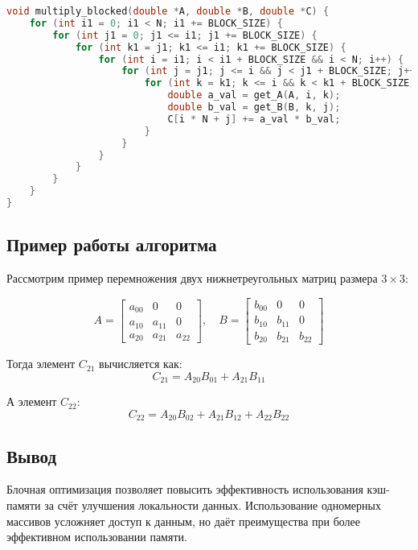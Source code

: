 \documentclass[14pt, russian]{matmex-diploma-custom}
\begin{document}
{\footnotesize
\begin{lstlisting}[language=C, caption={Алгоритм перемножения с блокировкой для 1D массивов}]
void multiply_blocked(double *A, double *B, double *C) {
    for (int i1 = 0; i1 < N; i1 += BLOCK_SIZE) {
        for (int j1 = 0; j1 <= i1; j1 += BLOCK_SIZE) {
            for (int k1 = j1; k1 <= i1; k1 += BLOCK_SIZE) {
                for (int i = i1; i < i1 + BLOCK_SIZE && i < N; i++) {
                    for (int j = j1; j <= i && j < j1 + BLOCK_SIZE; j++) {
                        for (int k = k1; k <= i && k < k1 + BLOCK_SIZE; k++) {
                            double a_val = get_A(A, i, k);
                            double b_val = get_B(B, k, j);
                            C[i * N + j] += a_val * b_val;
                        }
                    }
                }
            }
        }
    }
}

\end{lstlisting}
}

\subsection*{Пример работы алгоритма}

Рассмотрим пример перемножения двух нижнетреугольных матриц размера $3 \times 3$:

\begin{equation*}
A = \begin{bmatrix}
a_{00} & 0       & 0 \\
a_{10} & a_{11} & 0 \\
a_{20} & a_{21} & a_{22}
\end{bmatrix}, \quad
B = \begin{bmatrix}
b_{00} & 0       & 0 \\
b_{10} & b_{11} & 0 \\
b_{20} & b_{21} & b_{22}
\end{bmatrix}
\end{equation*}

Тогда элемент $C_{21}$ вычисляется как:
\begin{equation*}
C_{21} = A_{20} B_{01} + A_{21} B_{11}
\end{equation*}

А элемент $C_{22}$:
\begin{equation*}
C_{22} = A_{20} B_{02} + A_{21} B_{12} + A_{22} B_{22}
\end{equation*}

\subsection*{Вывод}
Блочная оптимизация позволяет повысить эффективность использования кэш-памяти за счёт улучшения локальности данных. Использование одномерных массивов усложняет доступ к данным, но даёт преимущества при более эффективном использовании памяти.
\end{document}
